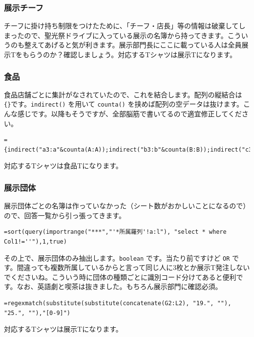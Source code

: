 \documentclass[a4paper]{ltjsreport}
\begin{document}
\subsubsection{展示チーフ}
チーフに掛け持ち制限をつけたために、「チーフ・店長」等の情報は破棄してしまったので、聖光祭ドライブに入っている展示の名簿から持ってきます。こういうのも整えてあげると気が利きます。展示部門長にここに載っている人は全員展示Tをもらうのか？確認しましょう。対応するTシャツは展示Tになります。

\subsubsection{食品}
食品店舗ごとに集計がなされていたので、これを結合します。配列の縦結合は \texttt{\{\}}です。\texttt{indirect()} を用いて \texttt{counta()} を挟めば配列の空データは抜けます。こんな感じです。以降もそうですが、全部脳筋で書いてるので適宜修正してください。

\begin{lstlisting}
={indirect("a3:a"&counta(A:A));indirect("b3:b"&counta(B:B));indirect("c3:c"&counta(C:C));indirect("d3:d"&counta(D:D));indirect("e3:e"&counta(E:E));indirect("f3:f"&counta(F:F));indirect("g3:g"&counta(G:G))}
\end{lstlisting}

対応するTシャツは食品Tになります。

\subsubsection{展示団体}
展示団体ごとの名簿は作っていなかった（シート数がおかしいことになるので）ので、回答一覧から引っ張ってきます。

\begin{lstlisting}
=sort(query(importrange("***","'*所属羅列'!a:l"), "select * where Col1!=''"),1,true)
\end{lstlisting}

その上で、展示団体のみ抽出します。\texttt{boolean} です。当たり前ですけど \texttt{OR} です。間違っても複数所属しているからと言って同じ人に3枚とか展示T発注しないでくださいね。こういう時に団体の種類ごとに識別コード分けてあると便利です。なお、英語劇と喫茶は抜きました。もちろん展示部門に確認必須。

\begin{lstlisting}
=regexmatch(substitute(substitute(concatenate(G2:L2), "19.", ""), "25.", ""),"[0-9]")
\end{lstlisting}

対応するTシャツは展示Tになります。
\end{document}
